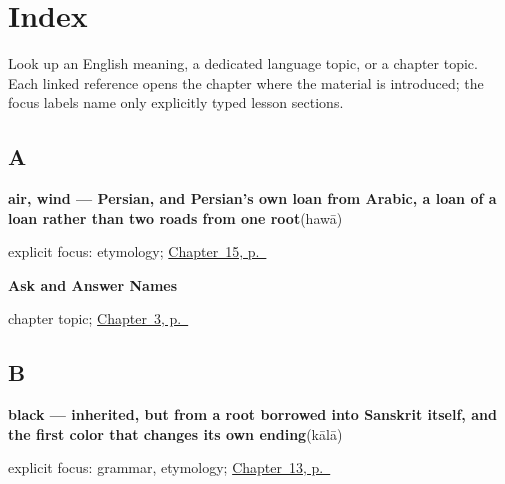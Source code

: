 
\chapter*{Index}

Look up an English meaning, a dedicated language topic, or a chapter topic. Each linked reference opens the chapter where the material is introduced; the focus labels name only explicitly typed lesson sections.

\section*{A}

\noindent\begin{minipage}[t]{\linewidth}
\raggedright
\textbf{air, wind — Persian, and Persian's own loan from Arabic, a loan of a loan rather than two roads from one root}\enspace\emph{}\enspace(hawā)\par
\footnotesize explicit focus: etymology; \hyperref[ch:ur-weather]{Chapter~15, p.~\pageref*{ch:ur-weather}}
\end{minipage}\par\smallskip

\noindent\begin{minipage}[t]{\linewidth}
\raggedright
\textbf{Ask and Answer Names}\par
\footnotesize chapter topic; \hyperref[ch:ur-ask-and-answer-names]{Chapter~3, p.~\pageref*{ch:ur-ask-and-answer-names}}
\end{minipage}\par\smallskip

\section*{B}

\noindent\begin{minipage}[t]{\linewidth}
\raggedright
\textbf{black — inherited, but from a root borrowed into Sanskrit itself, and the first color that changes its own ending}\enspace\emph{}\enspace(kālā)\par
\footnotesize explicit focus: grammar, etymology; \hyperref[ch:ur-colors]{Chapter~13, p.~\pageref*{ch:ur-colors}}
\end{minipage}\par\smallskip

